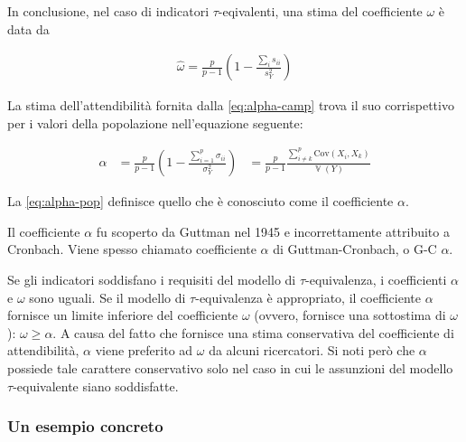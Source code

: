 \documentclass[
  11pt,
]{krantz}
\DeclareMathOperator{\V}{\mathbb{V}} %
\theoremstyle{definition}
\theoremstyle{definition}
\theoremstyle{definition}
\theoremstyle{definition}
\theoremstyle{remark}
\begin{document}
In conclusione, nel caso di indicatori \(\tau\)-eqivalenti, una stima del coefficiente \(\omega\) è data da

\begin{equation}
\begin{aligned}
\hat{\omega}
 = \frac{p}{p-1}\left(1-\frac{\sum_i s_{ii}}{s_Y^2}\right)
\label{eq:alpha-camp}
\end{aligned}
\end{equation}

La stima dell'attendibilità fornita dalla \eqref{eq:alpha-camp} trova il suo corrispettivo per i valori della popolazione nell'equazione seguente:

\begin{equation}
\begin{aligned}
\alpha &= \frac{p}{p-1}\left(1-\frac{\sum_{i=1}^p \sigma_{ii}}{\sigma_Y^2}\right)
&= \frac{p}{p-1}\frac{\sum_{i\neq k}^p \mbox{Cov}(X_i, X_k)}{\V(Y)}
\label{eq:alpha-pop}
\end{aligned}
\end{equation}

La \eqref{eq:alpha-pop} definisce quello che è conosciuto come il coefficiente \(\alpha\).

Il coefficiente \(\alpha\) fu scoperto da Guttman nel 1945 e incorrettamente attribuito a Cronbach. Viene spesso chiamato coefficiente \(\alpha\) di Guttman-Cronbach, o G-C \(\alpha\).

Se gli indicatori soddisfano i requisiti del modello di \(\tau\)-equivalenza, i coefficienti \(\alpha\) e \(\omega\) sono uguali. Se il modello di \(\tau\)-equivalenza è appropriato, il coefficiente \(\alpha\) fornisce un limite inferiore del coefficiente \(\omega\) (ovvero, fornisce una sottostima di \(\omega\)): \(\omega \geq \alpha\). A causa del fatto che fornisce una stima conservativa del coefficiente di attendibilità, \(\alpha\) viene preferito ad \(\omega\) da alcuni ricercatori. Si noti però che \(\alpha\) possiede tale carattere conservativo solo nel caso in cui le assunzioni del modello \(\tau\)-equivalente siano soddisfatte.

\hypertarget{un-esempio-concreto-1}{%
\subsubsection{Un esempio concreto}\label{un-esempio-concreto-1}}
\end{document}
